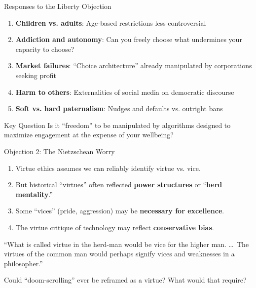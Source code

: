 ﻿\documentclass[aspectratio=169,11pt]{beamer}
\begin{document}
\begin{frame}{Responses to the Liberty Objection}
\begin{enumerate}
    \item \textbf{Children vs. adults}: Age-based restrictions less controversial
    
    \item \textbf{Addiction and autonomy}: Can you freely choose what undermines your capacity to choose?
    
    \item \textbf{Market failures}: ``Choice architecture'' already manipulated by corporations seeking profit
    
    \item \textbf{Harm to others}: Externalities of social media on democratic discourse
    
    \item \textbf{Soft vs. hard paternalism}: Nudges and defaults vs. outright bans
\end{enumerate}

\vspace{0.3cm}
\begin{alertblock}{Key Question}
Is it ``freedom'' to be manipulated by algorithms designed to maximize engagement at the expense of your wellbeing?
\end{alertblock}
\end{frame}

\begin{frame}{Objection 2: The Nietzschean Worry}
\begin{objectionbox}
\small
\begin{enumerate}
    \item Virtue ethics assumes we can reliably identify virtue vs. vice.
    \item But historical ``virtues'' often reflected \textbf{power structures} or ``\textbf{herd mentality}.''
    \item Some ``vices'' (pride, aggression) may be \textbf{necessary for excellence}.
    \item[\textbf{C.}] The virtue critique of technology may reflect \textbf{conservative bias}.
\end{enumerate}
\end{objectionbox}

\begin{quotebox}
\small ``What is called virtue in the herd-man would be vice for the higher man. \ldots\ The virtues of the common man would perhaps signify vices and weaknesses in a philosopher.''
\end{quotebox}

\begin{discussionbox}[Discussion]
Could ``doom-scrolling'' ever be reframed as a virtue? What would that require?
\end{discussionbox}
\end{frame}
\end{document}
